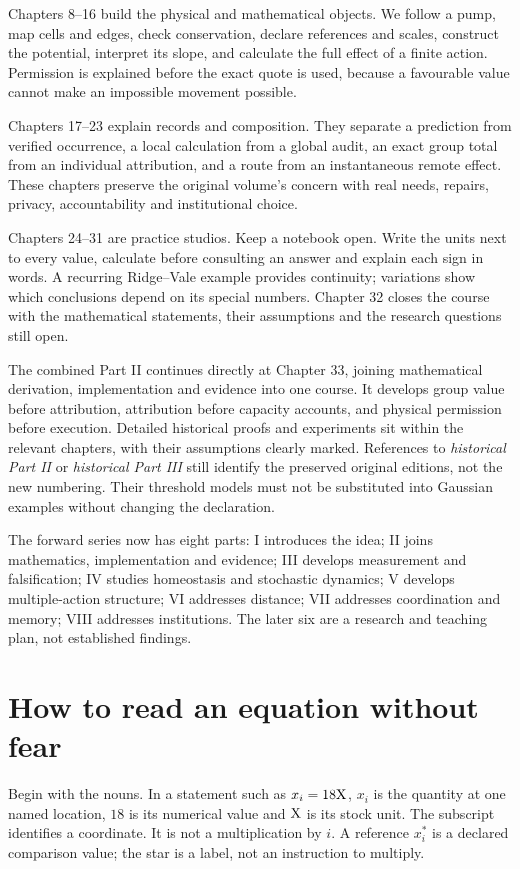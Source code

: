 Chapters 8--16 build the physical and mathematical objects. We follow a pump, map cells and edges, check conservation, declare references and scales, construct the potential, interpret its slope, and calculate the full effect of a finite action. Permission is explained before the exact quote is used, because a favourable value cannot make an impossible movement possible.

Chapters 17--23 explain records and composition. They separate a prediction from verified occurrence, a local calculation from a global audit, an exact group total from an individual attribution, and a route from an instantaneous remote effect. These chapters preserve the original volume's concern with real needs, repairs, privacy, accountability and institutional choice.

Chapters 24--31 are practice studios. Keep a notebook open. Write the units next to every value, calculate before consulting an answer and explain each sign in words. A recurring Ridge--Vale example provides continuity; variations show which conclusions depend on its special numbers. Chapter 32 closes the course with the mathematical statements, their assumptions and the research questions still open.

The combined Part II continues directly at Chapter 33, joining mathematical derivation, implementation and evidence into one course. It develops group value before attribution, attribution before capacity accounts, and physical permission before execution. Detailed historical proofs and experiments sit within the relevant chapters, with their assumptions clearly marked. References to \emph{historical Part II} or \emph{historical Part III} still identify the preserved original editions, not the new numbering. Their threshold models must not be substituted into Gaussian examples without changing the declaration.

The forward series now has eight parts: I introduces the idea; II joins mathematics, implementation and evidence; III develops measurement and falsification; IV studies homeostasis and stochastic dynamics; V develops multiple-action structure; VI addresses distance; VII addresses coordination and memory; VIII addresses institutions. The later six are a research and teaching plan, not established findings.

\chapter*{How to read an equation without fear}
Begin with the nouns. In a statement such as $x_i=18\mathrm{X}$, $x_i$ is the quantity at one named location, $18$ is its numerical value and $\mathrm{X}$ is its stock unit. The subscript identifies a coordinate. It is not a multiplication by $i$. A reference $x_i^*$ is a declared comparison value; the star is a label, not an instruction to multiply.

